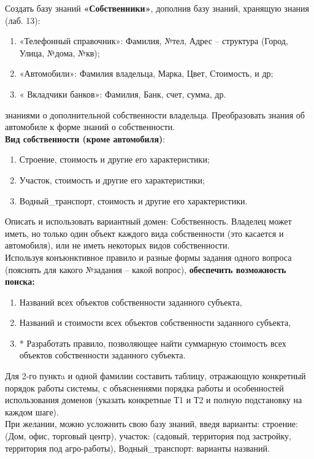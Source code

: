 \Large Создать базу знаний \textbf{«Собственники»}, дополнив базу знаний, хранящую знания  (лаб. 13):
\begin{enumerate}

	\item «Телефонный справочник»: Фамилия, №тел, Адрес – структура (Город, Улица, №дома, №кв);
	\item «Автомобили»: Фамилия владельца, Марка, Цвет, Стоимость, и др;
	\item « Вкладчики банков»: Фамилия, Банк, счет, сумма, др.
\end{enumerate}
знаниями о дополнительной собственности владельца. Преобразовать знания об автомобиле к форме знаний о собственности.\\
\textbf{Вид собственности (кроме автомобиля)}:
\begin{enumerate}
	\item	Строение, стоимость и другие его характеристики;
	\item	Участок, стоимость и другие его характеристики;
	\item	Водный\_транспорт, стоимость и другие его характеристики.
\end{enumerate}
Описать  и использовать вариантный домен: Собственность. Владелец может иметь, но только один объект каждого вида собственности (это касается и автомобиля), или не иметь некоторых видов собственности. \\
Используя конъюнктивное правило и 
разные формы задания одного вопроса (пояснять для какого №задания – какой вопрос), 
\textbf{обеспечить возможность поиска:}\begin{enumerate}
	\item	Названий всех объектов собственности заданного субъекта,
	\item	Названий и стоимости всех объектов собственности заданного субъекта,
	\item	* Разработать правило, позволяющее найти суммарную стоимость всех объектов собственности заданного субъекта.\end{enumerate}
Для 2-го пунктa и одной фамилии составить таблицу, отражающую конкретный порядок работы системы, с объяснениями порядка работы и особенностей использования доменов (указать конкретные Т1 и Т2 и полную подстановку на каждом шаге).\\
При желании, можно усложнить свою базу знаний, введя варианты: строение: (Дом, офис, торговый центр), участок: (садовый, территория под застройку, территория под агро-работы), Водный\_транспорт: варианты названий.

